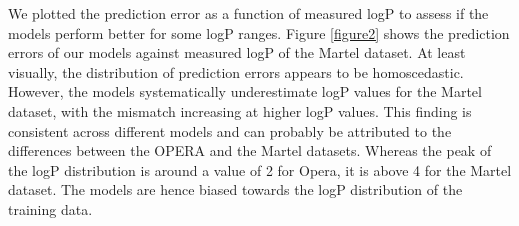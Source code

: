 \documentclass{article}
\begin{document}
We plotted the prediction error as a function of measured logP to assess if the models perform better for some logP ranges. Figure \ref{figure2} shows the prediction errors of our models against measured logP of the Martel dataset. At least visually, the distribution of prediction errors appears to be homoscedastic. However, the models systematically underestimate logP values for the Martel dataset, with the mismatch increasing at higher logP values. This finding is consistent across different models and can probably be attributed to the differences between the OPERA and the Martel datasets. Whereas the peak of the logP distribution is around a value of 2 for Opera, it is above 4 for the Martel dataset. The models are hence biased towards the logP distribution of the training data. \\
\end{document}
